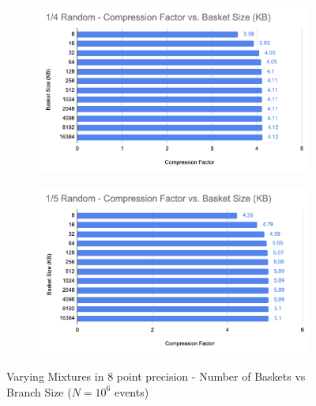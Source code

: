 \begin{figure}[h]
\begin{subfigure}{.5\textwidth}
        \includegraphics[width=\textwidth]{content/toymodel_content/3.28/1_of_4.png}
        \label{fig:toymodel_328_compF_vs_basketsize_subC}
      \end{subfigure}%
      \begin{subfigure}{.5\textwidth}
        \centering
        \includegraphics[width=\textwidth]{content/toymodel_content/3.28/1_of_5.png}
        \label{fig:toymodel_328_compF_vs_basketsize_subD}
      \end{subfigure}%
    \caption{Varying Mixtures in 8 point precision - Number of Baskets vs Branch Size ($N=10^6$ events)}
    \vspace{20px}
    \label{fig:toymodel_328_compF_vs_basketsize}
\end{figure}

